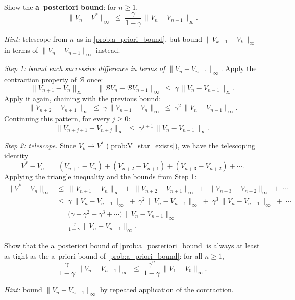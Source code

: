 \documentclass[11pt]{article}
\begin{document}
\begin{exercise}
\label{prob:a_posteriori_bound} Show the \textbf{a~posteriori bound}: for $n \ge 1$,
$$
\|V_n - V^*\|_\infty \;\le\; \frac{\gamma}{1-\gamma}\, \|V_n - V_{n-1}\|_\infty.
$$

\textit{Hint:} telescope from $n$ as in \cref{prob:a_priori_bound}, but bound $\|V_{k+1} - V_k\|_\infty$ in terms of $\|V_n - V_{n-1}\|_\infty$ instead.
\end{exercise}

\begin{solution}
\emph{Step 1: bound each successive difference in terms of $\|V_n - V_{n-1}\|_\infty$.} Apply the contraction property of $\mathcal{B}$ once:
$$
\|V_{n+1} - V_n\|_\infty \;=\; \|\mathcal{B} V_n - \mathcal{B} V_{n-1}\|_\infty \;\le\; \gamma\, \|V_n - V_{n-1}\|_\infty.
$$
Apply it again, chaining with the previous bound:
$$
\|V_{n+2} - V_{n+1}\|_\infty \;\le\; \gamma\, \|V_{n+1} - V_n\|_\infty \;\le\; \gamma^2\, \|V_n - V_{n-1}\|_\infty.
$$
Continuing this pattern, for every $j \ge 0$:
$$
\|V_{n+j+1} - V_{n+j}\|_\infty \;\le\; \gamma^{j+1}\, \|V_n - V_{n-1}\|_\infty.
$$

\emph{Step 2: telescope.} Since $V_k \to V^*$ (\cref{prob:V_star_exists}), we have the telescoping identity
$$
V^* - V_n \;=\; (V_{n+1} - V_n) + (V_{n+2} - V_{n+1}) + (V_{n+3} - V_{n+2}) + \cdots.
$$
Applying the triangle inequality and the bounds from Step 1:
\begin{align*}
\|V^* - V_n\|_\infty
&\le\; \|V_{n+1} - V_n\|_\infty \;+\; \|V_{n+2} - V_{n+1}\|_\infty \;+\; \|V_{n+3} - V_{n+2}\|_\infty \;+\; \cdots \\
&\le\; \gamma\, \|V_n - V_{n-1}\|_\infty \;+\; \gamma^2\, \|V_n - V_{n-1}\|_\infty \;+\; \gamma^3\, \|V_n - V_{n-1}\|_\infty \;+\; \cdots \\
&=\; \bigl(\gamma + \gamma^2 + \gamma^3 + \cdots\bigr)\, \|V_n - V_{n-1}\|_\infty \\
&=\; \frac{\gamma}{1-\gamma}\, \|V_n - V_{n-1}\|_\infty.
\end{align*}
\end{solution}

\begin{exercise}
\label{prob:a_posteriori_tighter} Show that the a~posteriori bound of \cref{prob:a_posteriori_bound} is always at least as tight as the a~priori bound of \cref{prob:a_priori_bound}: for all $n \ge 1$,
$$
\frac{\gamma}{1-\gamma}\, \|V_n - V_{n-1}\|_\infty \;\le\; \frac{\gamma^n}{1-\gamma}\, \|V_1 - V_0\|_\infty.
$$

\textit{Hint:} bound $\|V_n - V_{n-1}\|_\infty$ by repeated application of the contraction.
\end{exercise}
\end{document}
